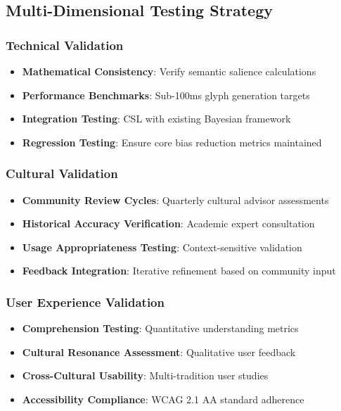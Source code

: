 \documentclass[12pt]{article}
\begin{document}
\subsection{Multi-Dimensional Testing Strategy}

\subsubsection{Technical Validation}
\begin{itemize}
    \item \textbf{Mathematical Consistency}: Verify semantic salience calculations
    \item \textbf{Performance Benchmarks}: Sub-100ms glyph generation targets
    \item \textbf{Integration Testing}: CSL with existing Bayesian framework
    \item \textbf{Regression Testing}: Ensure core bias reduction metrics maintained
\end{itemize}

\subsubsection{Cultural Validation}
\begin{itemize}
    \item \textbf{Community Review Cycles}: Quarterly cultural advisor assessments
    \item \textbf{Historical Accuracy Verification}: Academic expert consultation
    \item \textbf{Usage Appropriateness Testing}: Context-sensitive validation
    \item \textbf{Feedback Integration}: Iterative refinement based on community input
\end{itemize}

\subsubsection{User Experience Validation}
\begin{itemize}
    \item \textbf{Comprehension Testing}: Quantitative understanding metrics
    \item \textbf{Cultural Resonance Assessment}: Qualitative user feedback
    \item \textbf{Cross-Cultural Usability}: Multi-tradition user studies
    \item \textbf{Accessibility Compliance}: WCAG 2.1 AA standard adherence
\end{itemize}
\end{document}
